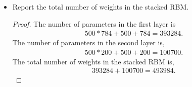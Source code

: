 \documentclass[12pt]{article}
\newcommand{\1}{\mathbf{1}}
\begin{document}
{\begin{itemize}
\begin{proof}
    The {\tt RMB} class contains following modules:
    \begin{itemize}
      \item {\tt \_\_init\_\_}: to initialize hyperparamters
      \item {\tt nextBatch}: to generate next batch index
      \item {\tt fit}: to fit and train the input data. We realize this function via following modules:
      \begin{itemize}
        \item {\tt build\_model}: to build the overall graph model for binary binary restricted boltzmann machine
        \item {\tt initialize\_tf}: to initialize all tensorflow variables and tensors.
        \item {\tt train\_model}: to update variables for each batch, where we use {\tt assign\_add} to assign a specific value to update parameters manually.
      \end{itemize}
      \item {\tt transform}: to transform data into hidden layer
    \end{itemize}
  \end{proof}
  \item Report the total number of weights in the stacked RBM.
  \begin{proof}
    The number of parameters in the first layer is
    \begin{align*}
      500 * 784 + 500 + 784 = 393284.
    \end{align*}
    The number of parameters in the second layer is,
    \begin{align*}
      500 * 200 + 500 + 200 = 100700.
    \end{align*}
    The total number of weights in the stacked RBM is,
    \begin{align*}
      393284 + 100700 = 493984.
    \end{align*}
  \end{proof}
\end{itemize}

}
\end{document}
